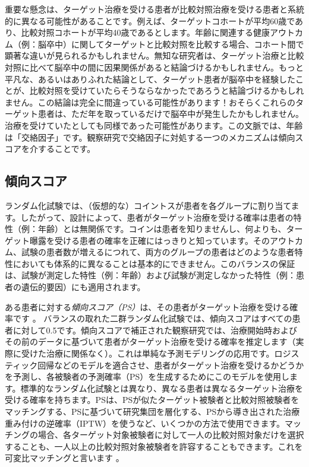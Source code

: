 \documentclass[
  11pt]{book}
\theoremstyle{definition}
\theoremstyle{definition}
\theoremstyle{definition}
\theoremstyle{definition}
\theoremstyle{remark}
\begin{document}
重要な懸念は、ターゲット治療を受ける患者が比較対照治療を受ける患者と系統的に異なる可能性があることです。例えば、ターゲットコホートが平均60歳であり、比較対照コホートが平均40歳であるとします。年齢に関連する健康アウトカム（例：脳卒中）に関してターゲットと比較対照を比較する場合、コホート間で顕著な違いが見られるかもしれません。無知な研究者は、ターゲット治療と比較対照に比べて脳卒中の間に因果関係があると結論づけるかもしれません。もっと平凡な、あるいはありふれた結論として、ターゲット患者が脳卒中を経験したことが、比較対照を受けていたらそうならなかったであろうと結論づけるかもしれません。この結論は完全に間違っている可能性があります！おそらくこれらのターゲット患者は、ただ年を取っているだけで脳卒中が発生したかもしれません。治療を受けていたとしても同様であった可能性があります。この文脈では、年齢は「交絡因子」です。観察研究で交絡因子に対処する一つのメカニズムは傾向スコアを介することです。 

\subsection{傾向スコア}\label{ux50beux5411ux30b9ux30b3ux30a2}


ランダム化試験では、（仮想的な）コイントスが患者を各グループに割り当てます。したがって、設計によって、患者がターゲット治療を受ける確率は患者の特性（例：年齢）とは無関係です。コインは患者を知りませんし、何よりも、ターゲット曝露を受ける患者の確率を正確にはっきりと知っています。そのアウトカム、試験の患者数が増えるにつれて、両方のグループの患者はどのような患者特性においても体系的に異なることは基本的にできません。このバランスの保証は、試験が測定した特性（例：年齢）および試験が測定しなかった特性（例：患者の遺伝的要因）にも適用されます。 

ある患者に対する\emph{傾向スコア（PS）}は、その患者がターゲット治療を受ける確率です \citep{rosenbaum_1983}。 バランスの取れた二群ランダム化試験では、傾向スコアはすべての患者に対して0.5です。傾向スコアで補正された観察研究では、治療開始時およびその前のデータに基づいて患者がターゲット治療を受ける確率を推定します（実際に受けた治療に関係なく）。これは単純な予測モデリングの応用です。ロジスティック回帰などのモデルを適合させ、患者がターゲット治療を受けるかどうかを予測し、各被験者の予測確率（PS）を生成するためにこのモデルを使用します。標準的なランダム化試験とは異なり、異なる患者は異なるターゲット治療を受ける確率を持ちます。PSは、PSが似たターゲット被験者と比較対照被験者をマッチングする、PSに基づいて研究集団を層化する、PSから導き出された治療重み付けの逆確率（IPTW）を使うなど、いくつかの方法で使用できます。マッチングの場合、各ターゲット対象被験者に対して一人の比較対照対象だけを選択することも、一人以上の比較対照対象被験者を許容することもできます。これを可変比マッチングと言います \citep{rassen_2012}。      
\end{document}
